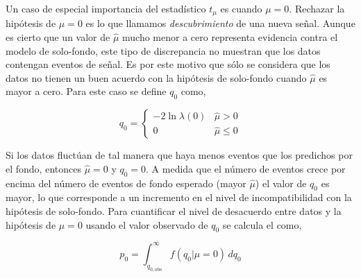 

Un caso de especial importancia del estadístico $t_\mu$ es cuando $\mu=0$.
Rechazar la hipótesis de $\mu=0$ es lo
que llamamos \emph{descubrimiento} de una nueva señal.
Aunque es cierto que un valor de $\hat{\mu}$ mucho menor a cero representa
evidencia contra el modelo de solo-fondo, este tipo de discrepancia no muestran
que los datos contengan eventos de señal. Es por este motivo que sólo se
considera que los datos no tienen un buen acuerdo con la hipótesis de solo-fondo
cuando $\hat{\mu}$ es mayor a cero.
Para este caso se define $q_0$ como,

\begin{equation}
  q_0 =
  \begin{cases}
    -2 \ln \lambda(0) & \hat{\mu} > 0 \\
    0 & \hat{\mu} \leq 0
  \end{cases}
\end{equation}

Si los datos fluctúan de tal manera que haya menos eventos que los predichos por
el fondo, entonces $\hat{\mu} = 0$ y $q_0=0$. A medida que el número de
eventos crece por encima del número de eventos de fondo esperado (mayor
$\hat{\mu}$) el valor de $q_0$ es mayor, lo que corresponde a un incremento en
el nivel de incompatibilidad con la hipótesis de solo-fondo. Para cuantificar el
nivel de desacuerdo entre datos y la hipótesis de $\mu=0$ usando el valor
observado de $q_0$ se calcula el {\pvalue} como,

\begin{equation}
  p_0 = \int_{q_{0,\text{obs}}}^{\infty} f(q_0|\mu=0) \, dq_0
  \label{eq:p0}
\end{equation}

